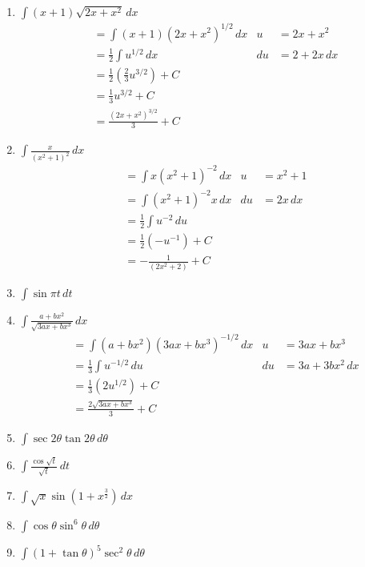 \documentclass[12pt]{article}
\newcommand{\mins}{-}
\newcommand{\inline}[1]{\({#1}\)}
\begin{document}
\begin{enumerate}
        \item \inline{\int{} (x + 1) \sqrt{2x + x^2} \, dx}
        \begin{align*}
            &= \int{} (x + 1) {(2x + x^2)}^{1/2} \, dx              & u &= 2x + x^2 \\
            &= \frac{1}{2} \int{} u^{1/2} \, dx                     & du &= 2 + 2x \, dx \\
            &= \frac{1}{2} \left(\frac{2}{3} u^{3/2}\right) + C \\
            &= \frac{1}{3} u^{3/2} + C \\
            &= \frac{{(2x + x^2)}^{3/2}}{3} + C
        \end{align*}

        \item \inline{\int{} \frac{x}{{({x^2 + 1})}^2} \, dx}
        \begin{align*}
            &= \int{} x {(x^2 + 1)}^{-2} \, dx                      & u &= x^2 + 1 \\
            &= \int{} {(x^2 + 1)}^{-2} x \, dx                      & du &= 2x \, dx \\
            &= \frac{1}{2} \int{} u^{-2} \, du \\
            &= \frac{1}{2} \left(-u^{-1}\right) + C \\
            &= -\frac{1}{(2x^2 + 2)} + C
        \end{align*}

        \item \inline{\int{} \sin{\pi{} t} \, dt}

        \item \inline{\int{} \frac{a + bx^2}{\sqrt{3ax + bx^3}} \, dx}
        \newpage\begin{align*}
            &= \int (a + bx^2) {(3ax + bx^3)}^{\mins{} 1/2} \, dx            & u &= 3ax + bx^3 \\
            &= \frac{1}{3} \int{} u^{\mins{} 1/2} \, du                      & du &= 3a + 3bx^2 \, dx \\ 
            &= \frac{1}{3} \left(2u^{1/2}\right) + C \\
            &= \frac{2 \sqrt{3ax + bx^3}}{3} + C
        \end{align*}

        \item \inline{\int{} \sec{2\theta{}} \tan{2\theta{}} \, d\theta}
        \item \inline{\int{} \frac{\cos{\sqrt{t}}}{\sqrt{t}} \, dt}
        \item \inline{\int{} \sqrt{x} \sin{(1 + x^{\frac{3}{2}})} \, dx}
        \item \inline{\int{} \cos{\theta{}} \sin^6{\theta{}} \, d\theta{}}
        \item \inline{\int{} {(1 + \tan{\theta})}^5 \sec^2{\theta{}} \, d\theta{}}


\end{enumerate}
\end{document}
